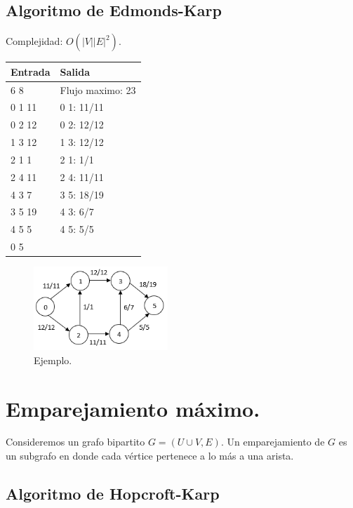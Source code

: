\documentclass[12pt, letterpaper, twoside]{article}
\begin{document}
\subsection{Algoritmo de Edmonds-Karp}

Complejidad: $O(|V||E|^2)$.

 \medskip

\begin{tabular}{|p{7cm}|p{7cm}|}
\hline
\textbf{Entrada} & \textbf{Salida}\\ \hline
6 8 & Flujo maximo: 23\\
0 1 11 & 0 1: 11/11\\
0 2 12 & 0 2: 12/12\\
1 3 12 & 1 3: 12/12\\
2 1 1  & 2 1: 1/1\\
2 4 11 & 2 4: 11/11\\
4 3 7  & 3 5: 18/19\\
3 5 19 & 4 3: 6/7\\
4 5 5 & 4 5: 5/5\\ 
0 5 & \\ \hline
\end{tabular}

\begin{figure}[h]
\centering
\includegraphics[width = 0.45\textwidth]{MaxFlow.png}

\caption{Ejemplo.}
\end{figure}

\newpage

\section{Emparejamiento máximo.}

Consideremos un grafo bipartito $G = (U \cup V, E)$. Un emparejamiento de $G$ es un subgrafo en donde cada vértice pertenece a lo más a una arista.

\subsection{Algoritmo de Hopcroft-Karp}
\end{document}
